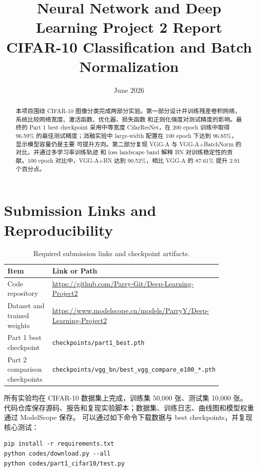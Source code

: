 \documentclass[11pt,a4paper]{ctexart}
\title{\textbf{Neural Network and Deep Learning Project 2 Report}\\CIFAR-10 Classification and Batch Normalization}
\author{\studentName \quad \studentID}
\date{June 2026}
\newcommand{\githubRepo}{\url{https://github.com/Parry-Git/Deep-Learning-Project2}}
\newcommand{\modelscopeRepo}{\url{https://www.modelscope.cn/models/ParryY/Deep-Learning-Project2}}
\newcommand{\bestPartOneAcc}{96.59\%}
\newcommand{\bestPartOneObservedAcc}{96.85\%}
\newcommand{\bestVggAcc}{90.52\%}
\begin{document}
\maketitle

\begin{abstract}
本项目围绕 CIFAR-10 图像分类完成两部分实验。第一部分设计并训练残差卷积网络，系统比较网络宽度、激活函数、优化器、损失函数
和正则化强度对测试精度的影响。最终的 Part 1 best checkpoint 采用中等宽度
CifarResNet，在 200 epoch 训练中取得 \bestPartOneAcc{} 的最佳测试精度；消融实验中
large-width 配置在 100 epoch 下达到 \bestPartOneObservedAcc{}，显示模型容量仍是主要
可提升方向。第二部分复现 VGG-A 与 VGG-A+BatchNorm 的对比，并通过多学习率训练轨迹
和 loss landscape band 解释 BN 对训练稳定性的贡献。100 epoch 对比中，VGG-A+BN 达到
\bestVggAcc{}，相比 VGG-A 的 87.61\% 提升 2.91 个百分点。
\end{abstract}

\section{Submission Links and Reproducibility}

\begin{table}[H]
\centering
\caption{Required submission links and checkpoint artifacts.}
\begin{tabular}{>{\raggedright\arraybackslash}p{0.28\linewidth}p{0.58\linewidth}}
\toprule
Item & Link or Path \\
\midrule
Code repository & \githubRepo{} \\
Dataset and trained weights & \modelscopeRepo{} \\
Part 1 best checkpoint & \texttt{checkpoints/part1\_best.pth} \\
Part 2 comparison checkpoints &
\texttt{checkpoints/vgg\_bn/best\_vgg\_compare\_e100\_*.pth} \\
\bottomrule
\end{tabular}
\end{table}

所有实验均在 CIFAR-10 数据集上完成，训练集 50,000 张、测试集 10,000 张。
代码仓库保存源码、报告和复现实验脚本；数据集、训练日志、曲线图和模型权重通过 ModelScope 保存。
可以通过如下命令下载数据与 best checkpoints，并复现核心测试：

\begin{verbatim}
pip install -r requirements.txt
python codes/download.py --all
python codes/part1_cifar10/test.py
\end{verbatim}
\end{document}
